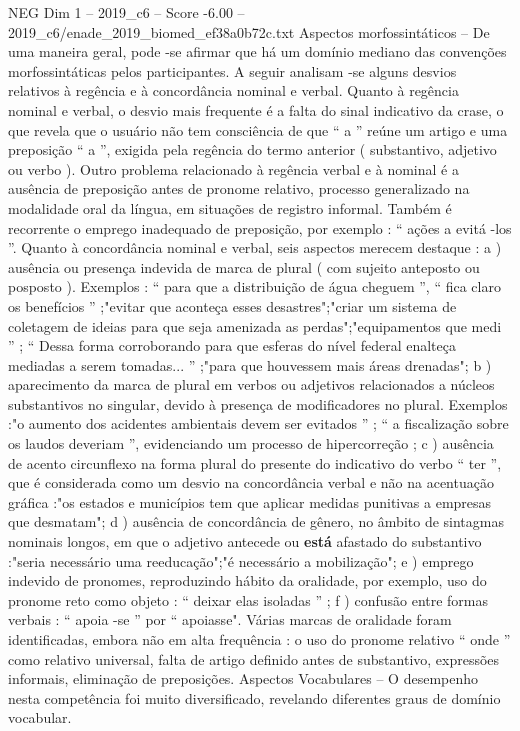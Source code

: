 \begin{textsample}{NEG Dim 1 – 2019\_c6 – Score -6.00 – 2019\_c6/enade\_2019\_biomed\_ef38a0b72c.txt}
Aspectos morfossintáticos – De uma maneira geral, pode -se afirmar que há um domínio mediano das convenções morfossintáticas pelos participantes.
A seguir analisam -se alguns desvios relativos à regência e à concordância nominal e verbal.
Quanto à regência nominal e verbal, o desvio mais frequente é a falta do sinal indicativo da crase, o que revela que o usuário não tem consciência de que “ a ” reúne um artigo e uma preposição “ a ”, exigida pela regência do termo anterior ( substantivo, adjetivo ou verbo ).
Outro problema relacionado à regência verbal e à nominal é a ausência de preposição antes de pronome relativo, processo generalizado na modalidade oral da língua, em situações de registro informal.
Também é recorrente o emprego inadequado de preposição, por exemplo : “ ações a evitá -los ”.
Quanto à concordância nominal e verbal, seis aspectos merecem destaque : a ) ausência ou presença indevida de marca de plural ( com sujeito anteposto ou posposto ).
Exemplos : “ para que a distribuição de água cheguem ”, “ fica claro os benefícios ” ;"evitar que aconteça esses desastres";"criar um sistema de coletagem de ideias para que seja amenizada as perdas";"equipamentos que medi ” ; “ Dessa forma corroborando para que esferas do nível federal enalteça mediadas a serem tomadas... ” ;"para que houvessem mais áreas drenadas"; b ) aparecimento da marca de plural em verbos ou adjetivos relacionados a núcleos substantivos no singular, devido à presença de modificadores no plural.
Exemplos :"o aumento dos acidentes ambientais devem ser evitados ” ; “ a fiscalização sobre os laudos deveriam ”, evidenciando um processo de hipercorreção ; c ) ausência de acento circunflexo na forma plural do presente do indicativo do verbo “ ter ”, que é considerada como um desvio na concordância verbal e não na acentuação gráfica :"os estados e municípios tem que aplicar medidas punitivas a empresas que desmatam"; d ) ausência de concordância de gênero, no âmbito de sintagmas nominais longos, em que o adjetivo antecede ou \textbf{está} afastado do substantivo :"seria necessário uma reeducação";"é necessário a mobilização"; e ) emprego indevido de pronomes, reproduzindo hábito da oralidade, por exemplo, uso do pronome reto como objeto : “ deixar elas isoladas ” ; f ) confusão entre formas verbais : “ apoia -se ” por “ apoiasse".
Várias marcas de oralidade foram identificadas, embora não em alta frequência : o uso do pronome relativo “ onde ” como relativo universal, falta de artigo definido antes de substantivo, expressões informais, eliminação de preposições.
Aspectos Vocabulares – O desempenho nesta competência foi muito diversificado, revelando diferentes graus de domínio vocabular.

\end{textsample}
